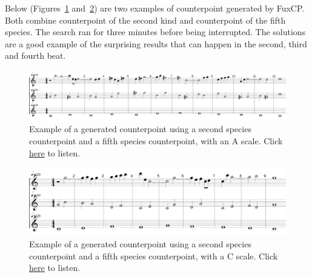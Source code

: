 Below (Figures~\ref{fig:musicality-5sp-la} and~\ref{fig:musicality-5sp-do}) are two examples of counterpoint generated by FuxCP. Both combine counterpoint of the second kind and counterpoint of the fifth species. The search ran for three minutes before being interrupted. The solutions are a good example of the surprising results that can happen in the second, third and fourth beat.

\begin{figure}[h!]
    \centering
    \includegraphics[width=1\textwidth]{Images/Musicality/musicality-5sp-la.png}
    \caption{Example of a generated counterpoint using a second species counterpoint and a fifth species counterpoint, with an A scale. Click \href{https://youtu.be/scifkjh1YZU}{here} to listen.}
    \label{fig:musicality-5sp-la}
\end{figure}

\begin{figure}[h!]
    \centering
    \includegraphics[width=1\textwidth]{Images/Musicality/musicality-5sp-do.png}
    \caption{Example of a generated counterpoint using a second species counterpoint and a fifth species counterpoint, with a C scale. Click \href{https://youtu.be/b64eOMNN8BA}{here} to listen.}
    \label{fig:musicality-5sp-do}
\end{figure}